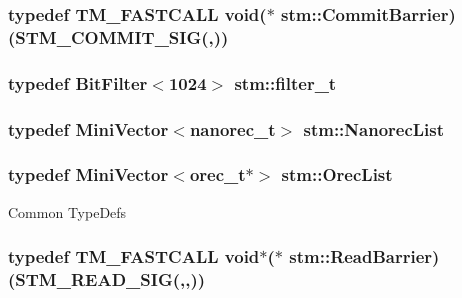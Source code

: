 \hypertarget{namespacestm_a16e5b681852106be63d320e490c05165}{
\subsubsection[{Commit\-Barrier}]{\setlength{\rightskip}{0pt plus 5cm}typedef {\bf T\-M\-\_\-\-F\-A\-S\-T\-C\-A\-L\-L} void($\ast$ stm\-::\-Commit\-Barrier)({\bf S\-T\-M\-\_\-\-C\-O\-M\-M\-I\-T\-\_\-\-S\-I\-G}(,))}}\label{namespacestm_a16e5b681852106be63d320e490c05165}
\hypertarget{namespacestm_a34196fa5dc72823aaaa307a6e353704e}{
\subsubsection[{filter\-\_\-t}]{\setlength{\rightskip}{0pt plus 5cm}typedef {\bf Bit\-Filter}$<$1024$>$ stm\-::filter\-\_\-t}}\label{namespacestm_a34196fa5dc72823aaaa307a6e353704e}
\hypertarget{namespacestm_a5a70108dbd954a2634cf59d668ea8241}{
\subsubsection[{Nanorec\-List}]{\setlength{\rightskip}{0pt plus 5cm}typedef {\bf Mini\-Vector}$<${\bf nanorec\-\_\-t}$>$ stm\-::\-Nanorec\-List}}\label{namespacestm_a5a70108dbd954a2634cf59d668ea8241}
\hypertarget{namespacestm_aa243a42287cc0cf0fdf20fb4cddd4d02}{
\subsubsection[{Orec\-List}]{\setlength{\rightskip}{0pt plus 5cm}typedef {\bf Mini\-Vector}$<${\bf orec\-\_\-t}$\ast$$>$ stm\-::\-Orec\-List}}\label{namespacestm_aa243a42287cc0cf0fdf20fb4cddd4d02}
Common Type\-Defs \hypertarget{namespacestm_a656ebc647a656fffc1ff640cb818c669}{
\subsubsection[{Read\-Barrier}]{\setlength{\rightskip}{0pt plus 5cm}typedef {\bf T\-M\-\_\-\-F\-A\-S\-T\-C\-A\-L\-L} void$\ast$($\ast$ stm\-::\-Read\-Barrier)({\bf S\-T\-M\-\_\-\-R\-E\-A\-D\-\_\-\-S\-I\-G}(,,))}}\label{namespacestm_a656ebc647a656fffc1ff640cb818c669}
